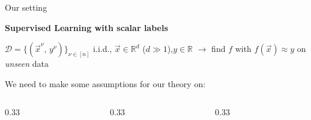 \documentclass[aspectratio=169,11pt]{beamer}
\begin{document}
\begin{frame}{Our setting}
  \begin{center}
    {\Large\bfseries Supervised Learning with scalar labels}
  \end{center}
  \vspace{0.3em}
  \begin{center}
    \small
    $\mathcal{D} = \{(\vec{x}^\nu,\, y^\nu)\}_{\nu \in [n]}$ i.i.d.,\quad
    $\vec{x} \in \mathbb{R}^d$ ($d \gg 1$),\quad $y \in \mathbb{R}$
    \quad$\longrightarrow$\quad
    find $f$ with $f(\vec{x}) \approx y$ on \emph{unseen} data
  \end{center}
  \begin{center}
  \end{center}
  \pause
  \begin{center}
    \large We need to make some assumptions for our theory on:
  \end{center}
  \vspace{0.4em}
  \begin{columns}[t]
    \begin{column}{0.33\textwidth}\centering
      \icondata\par\vspace{0.25em}
      \par\vspace{0.2em}
    \end{column}
    \begin{column}{0.33\textwidth}\centering
      \iconmodel\par\vspace{0.25em}
      \par\vspace{0.2em}
    \end{column}
    \begin{column}{0.33\textwidth}\centering
      \iconalgo\par\vspace{0.25em}
      \par\vspace{0.2em}

\end{column}
\end{columns}
\end{frame}
\end{document}
